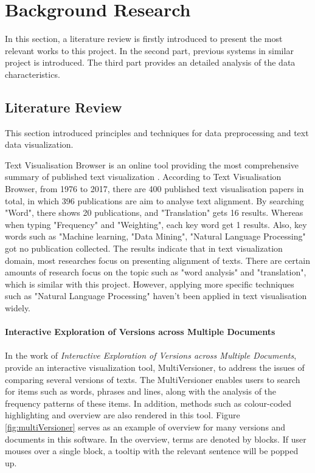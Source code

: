 \clearpage
\section{Background Research}

In this section, a literature review is firstly introduced to present the most relevant works to this project. In the second part, previous systems in similar project is introduced. The third part provides an detailed analysis of the data characteristics.

\subsection{Literature Review}
This section introduced principles and techniques for data preprocessing and text data visualization.

Text Visualisation Browser \cite{Kucher2014} is an online tool providing the most comprehensive summary of published text visualization \cite{Cao2016}. According to Text Visualisation Browser, from 1976 to 2017, there are 400 published text visualisation papers in total, in which 396 publications are aim to analyse text alignment. By searching "Word", there shows 20 publications, and "Translation" gets 16 results. Whereas when typing "Frequency" and "Weighting", each key word get 1 results. Also, key words such as "Machine learning, "Data Mining", "Natural Language Processing" got no publication collected. The results indicate that in text visualization domain, most researches focus on presenting alignment of texts. There are certain amounts of research focus on the topic such as "word analysis" and "translation", which is similar with this project. However, applying more specific techniques such as "Natural Language Processing" haven't been applied in text visualisation widely.


\paragraph{Interactive Exploration of Versions across Multiple Documents}

\paragraph[]{}In the work of \emph{Interactive Exploration of Versions across Multiple Documents}, \cite{Jong2008} provide an interactive visualization tool, MultiVersioner, to address the issues of comparing several versions of texts. The MultiVersioner enables users to search for items such as words, phrases and lines, along with the analysis of the frequency patterns of these items. In addition, methods such as colour-coded highlighting and overview are also rendered in this tool. Figure \ref{fig:multiVersioner} serves as an example of overview for many versions and documents in this software. In the overview, terms are denoted by blocks. If user mouses over a single block, a tooltip with the relevant sentence will be popped up.

